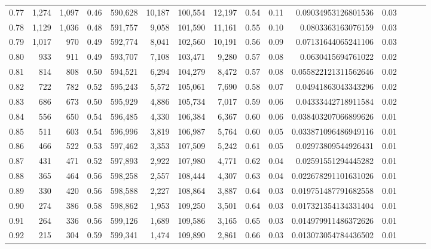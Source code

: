 \begin{tabular}{rrrrrrrrrrrrrrr}
0.77 &   1,274 &  1,097 &  0.46 &  590,628 &   10,187 &  100,554 &   12,197 &  0.54 &  0.11 &   0.09034953126801536 &      0.03 \\
0.78 &   1,129 &  1,036 &  0.48 &  591,757 &    9,058 &  101,590 &   11,161 &  0.55 &  0.10 &    0.0803363163076159 &      0.03 \\
0.79 &   1,017 &    970 &  0.49 &  592,774 &    8,041 &  102,560 &   10,191 &  0.56 &  0.09 &   0.07131644065241106 &      0.03 \\
0.80 &     933 &    911 &  0.49 &  593,707 &    7,108 &  103,471 &    9,280 &  0.57 &  0.08 &    0.0630415694761022 &      0.02 \\
0.81 &     814 &    808 &  0.50 &  594,521 &    6,294 &  104,279 &    8,472 &  0.57 &  0.08 &  0.055822121311562646 &      0.02 \\
0.82 &     722 &    782 &  0.52 &  595,243 &    5,572 &  105,061 &    7,690 &  0.58 &  0.07 &   0.04941863043343296 &      0.02 \\
0.83 &     686 &    673 &  0.50 &  595,929 &    4,886 &  105,734 &    7,017 &  0.59 &  0.06 &   0.04333442718911584 &      0.02 \\
0.84 &     556 &    650 &  0.54 &  596,485 &    4,330 &  106,384 &    6,367 &  0.60 &  0.06 &  0.038403207066899626 &      0.01 \\
0.85 &     511 &    603 &  0.54 &  596,996 &    3,819 &  106,987 &    5,764 &  0.60 &  0.05 &  0.033871096486949116 &      0.01 \\
0.86 &     466 &    522 &  0.53 &  597,462 &    3,353 &  107,509 &    5,242 &  0.61 &  0.05 &   0.02973809544926431 &      0.01 \\
0.87 &     431 &    471 &  0.52 &  597,893 &    2,922 &  107,980 &    4,771 &  0.62 &  0.04 &   0.02591551294445282 &      0.01 \\
0.88 &     365 &    464 &  0.56 &  598,258 &    2,557 &  108,444 &    4,307 &  0.63 &  0.04 &  0.022678291101631026 &      0.01 \\
0.89 &     330 &    420 &  0.56 &  598,588 &    2,227 &  108,864 &    3,887 &  0.64 &  0.03 &  0.019751487791682558 &      0.01 \\
0.90 &     274 &    386 &  0.58 &  598,862 &    1,953 &  109,250 &    3,501 &  0.64 &  0.03 &  0.017321354134331404 &      0.01 \\
0.91 &     264 &    336 &  0.56 &  599,126 &    1,689 &  109,586 &    3,165 &  0.65 &  0.03 &  0.014979911486372626 &      0.01 \\
0.92 &     215 &    304 &  0.59 &  599,341 &    1,474 &  109,890 &    2,861 &  0.66 &  0.03 &  0.013073054784436502 &      0.01 \\

\end{tabular}
